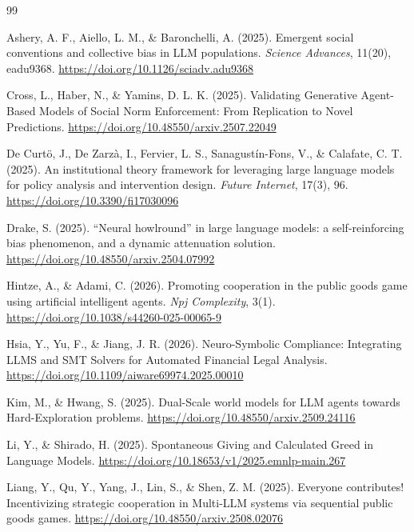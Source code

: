 \documentclass[12pt,letterpaper]{article}
\begin{document}
\begin{thebibliography}{99}

Ashery, A. F., Aiello, L. M., \& Baronchelli, A. (2025). Emergent social conventions and collective bias in LLM populations. \textit{Science Advances}, 11(20), eadu9368. \url{https://doi.org/10.1126/sciadv.adu9368}

Cross, L., Haber, N., \& Yamins, D. L. K. (2025). Validating Generative Agent-Based Models of Social Norm Enforcement: From Replication to Novel Predictions. \url{https://doi.org/10.48550/arxiv.2507.22049}

De Curt\"o, J., De Zarz\`a, I., Fervier, L. S., Sanagust\'in-Fons, V., \& Calafate, C. T. (2025). An institutional theory framework for leveraging large language models for policy analysis and intervention design. \textit{Future Internet}, 17(3), 96. \url{https://doi.org/10.3390/fi17030096}

Drake, S. (2025). ``Neural howlround'' in large language models: a self-reinforcing bias phenomenon, and a dynamic attenuation solution. \url{https://doi.org/10.48550/arxiv.2504.07992}

Hintze, A., \& Adami, C. (2026). Promoting cooperation in the public goods game using artificial intelligent agents. \textit{Npj Complexity}, 3(1). \url{https://doi.org/10.1038/s44260-025-00065-9}

Hsia, Y., Yu, F., \& Jiang, J. R. (2026). Neuro-Symbolic Compliance: Integrating LLMS and SMT Solvers for Automated Financial Legal Analysis. \url{https://doi.org/10.1109/aiware69974.2025.00010}

Kim, M., \& Hwang, S. (2025). Dual-Scale world models for LLM agents towards Hard-Exploration problems. \url{https://doi.org/10.48550/arxiv.2509.24116}

Li, Y., \& Shirado, H. (2025). Spontaneous Giving and Calculated Greed in Language Models. \url{https://doi.org/10.18653/v1/2025.emnlp-main.267}

Liang, Y., Qu, Y., Yang, J., Lin, S., \& Shen, Z. M. (2025). Everyone contributes! Incentivizing strategic cooperation in Multi-LLM systems via sequential public goods games. \url{https://doi.org/10.48550/arxiv.2508.02076}


\end{thebibliography}
\end{document}
